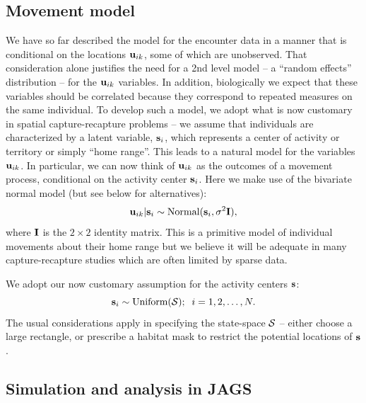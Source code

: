 \subsection{Movement model}

We have so far described the model for the encounter data in a manner
that is conditional on the locations ${\bf u}_{ik}$, some of which are
unobserved. That consideration alone justifies the need for a 2nd
level model -- a ``random effects'' distribution -- for the ${\bf
  u}_{ik}$ variables. In addition, biologically we expect that these
variables should be correlated because they correspond to repeated
measures on the same individual.  To develop such a model, we adopt
what is now customary in spatial capture-recapture problems -- we
assume that individuals are characterized by a latent variable, ${\bf
  s}_{i}$, which represents a center of activity or territory or
simply ``home range''. This leads to a natural model for the variables
${\bf u}_{ik}$. In particular, we can now think of ${\bf u}_{ik}$ as
the outcomes of a movement process, conditional on the activity center
${\bf  s}_{i}$. Here we make use of the bivariate normal model (but
see below for alternatives):
\[
 {\bf u}_{ik} | {\bf s}_{i} \sim \mbox{Normal}({\bf s}_{i}, \sigma^{2}{\bf I}),
\]
where ${\bf I}$ is the $2\times 2$ identity matrix.  This is a
primitive model of individual movements about their home range but we
believe it will be adequate in many capture-recapture studies which
are often limited by sparse data.

We adopt our now customary assumption for the activity centers ${\bf s}$:
\[
 {\bf s}_{i} \sim \mbox{Uniform}({\cal S}); \; \; i=1,2,\ldots,N.
\]
The usual considerations apply in specifying the state-space ${\cal
  S}$ -- either choose a large rectangle, or prescribe a habitat mask
to restrict the potential locations of ${\bf s}$.



\subsection{Simulation and analysis in {\bf JAGS}}

